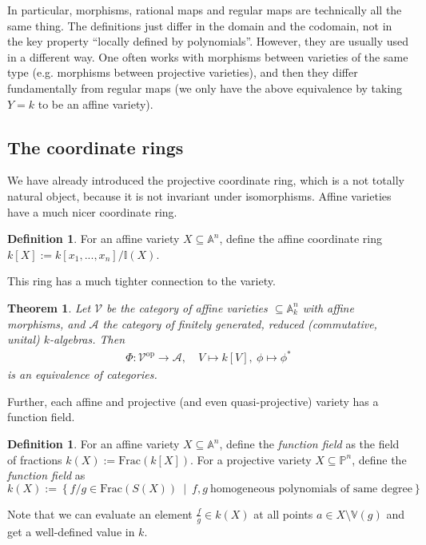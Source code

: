 \documentclass{scrartcl}
\newcommand{\I}{\mathbb{I}}
\newcommand{\V}{\mathbb{V}}
\newtheorem{theorem}[prop]{Theorem}
\theoremstyle{definition}
\newtheorem{definition}[prop]{Definition}
\begin{document}
In particular, morphisms, rational maps and regular maps are technically all the same thing.
The definitions just differ in the domain and the codomain, not in the key property ``locally defined by polynomials''.
However, they are usually used in a different way.
One often works with morphisms between varieties of the same type (e.g. morphisms between projective varieties), and then they differ fundamentally from regular maps (we only have the above equivalence by taking $Y = k$ to be an affine variety).

\subsection{The coordinate rings}
We have already introduced the projective coordinate ring, which is a not totally natural object, because it is not invariant under isomorphisms.
Affine varieties have a much nicer coordinate ring.
\begin{definition}
    For an affine variety $X \subseteq \mathbb{A}^n$, define the affine coordinate ring $k[X] := k[x_1, ..., x_n] / \I(X)$.
\end{definition}
This ring has a much tighter connection to the variety.
\begin{theorem}
    Let $\mathcal{V}$ be the category of affine varieties $\subseteq \mathbb{A}_k^n$ with affine morphisms, and $\mathcal{A}$ the category of finitely generated, reduced (commutative, unital) $k$-algebras.
    Then
    \begin{align*}
        \Phi: \mathcal{V}^{\mathrm{op}} \to \mathcal{A}, \quad V \mapsto k[V], \ \phi \mapsto \phi^*
    \end{align*}
    is an equivalence of categories.
\end{theorem}
Further, each affine and projective (and even quasi-projective) variety has a function field.
\begin{definition}
    For an affine variety $X \subseteq \mathbb{A}^n$, define the \emph{function field} as the field of fractions $k(X) := \mathrm{Frac}(k[X])$.
    For a projective variety $X \subseteq \mathbb{P}^n$, define the \emph{function field} as
    \begin{equation*}
        k(X) := \left\{ f/g \in \mathrm{Frac}(S(X)) \ \middle| \ f, g \ \text{homogeneous polynomials of same degree} \right\}
    \end{equation*}
\end{definition}
Note that we can evaluate an element $\frac f g \in k(X)$ at all points $a \in X \setminus \V(g)$ and get a well-defined value in $k$.
\end{document}

